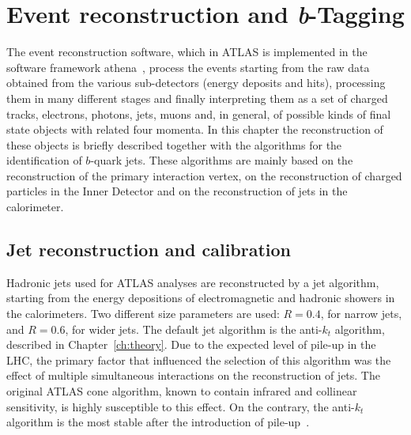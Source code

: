 %
%

\chapter{Event reconstruction and \emph{\textbf{b}}-Tagging }\label{ch:reco}


The event reconstruction software, which in ATLAS is implemented in the software framework {\sc athena}~\cite{Calafiura2005zz}, process the events starting from the raw data obtained from the various sub-detectors (energy deposits and hits), processing them in many different stages and finally interpreting them as a set of charged tracks, electrons, photons, jets, muons and, in general, of possible kinds of final state objects with related four momenta.  
In this chapter the reconstruction of these objects is briefly described together with the algorithms for the identification of $b$-quark jets.  These algorithms are mainly based on the reconstruction of the primary interaction vertex, on the reconstruction of charged particles in the Inner Detector and on the reconstruction of jets in the calorimeter.   

\section{Jet reconstruction and calibration}\label{sec:ObjSelection}

Hadronic jets used for ATLAS analyses are reconstructed by a jet algorithm, starting from the energy depositions of electromagnetic and hadronic showers in the calorimeters.  Two different size parameters are used: $R = 0.4$, for narrow jets, and $R = 0.6$, for wider jets. The default jet algorithm is the anti-$k_t$ algorithm, described in Chapter~\ref{ch:theory}. Due to the expected level of pile-up in the LHC, the primary factor that influenced the selection of this algorithm was the effect of multiple simultaneous interactions on the reconstruction of jets. The original ATLAS cone algorithm, known to contain infrared and collinear sensitivity, is highly susceptible to this effect. On the contrary, the anti-$k_t$ algorithm is the most stable after the introduction of pile-up~\cite{Asquith:1311867}.  

